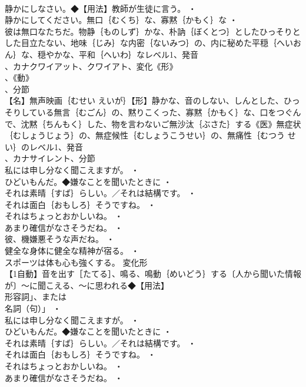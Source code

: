 \documentclass[8pt]{extreport}
\begin{document}
\begin{CJK}{UTF8}{min}
\\	静かにしなさい。◆【用法】教師が生徒に言う。 ・
\\	静かにしてください。無口｛むくち｝な、寡黙｛かもく｝な ・
\\	彼は無口なたちだ。物静｛ものしず｝かな、朴訥｛ぼくとつ｝としたひっそりとした目立たない、地味｛じみ｝な内密｛ないみつ｝の、内に秘めた平穏｛へいおん｝な、穏やかな、平和｛へいわ｝なレベル1、発音
\\	、カナクワイアット、クワイアト、変化《形》
\\	、《動》
\\	、分節
\\	【名】無声映画｛むせい えいが｝【形】静かな、音のしない、しんとした、ひっそりしている無言｛むごん｝の、黙りこくった、寡黙｛かもく｝な、口をつぐんで、沈黙｛ちんもく｝した、物を言わないご無沙汰｛ぶさた｝する《医》無症状｛むしょうじょう｝の、無症候性｛むしょうこうせい｝の、無痛性｛むつう せい｝のレベル1、発音
\\	、カナサイレント、分節
\\	私には申し分なく聞こえますが。 ・
\\	ひどいもんだ。◆嫌なことを聞いたときに ・
\\	それは素晴｛すば｝らしい。／それは結構です。 ・
\\	それは面白｛おもしろ｝そうですね。 ・
\\	それはちょっとおかしいね。 ・
\\	あまり確信がなさそうだね。 ・
\\	彼、機嫌悪そうな声だね。 ・
\\	健全な身体に健全な精神が宿る。 ・
\\	スポーツは体も心も強くする。	変化形 
\\	【1自動】音を出す［たてる］、鳴る、鳴動｛めいどう｝する〔人から聞いた情報が〕～に聞こえる、～に思われる◆【用法】
\\	形容詞」、または
\\	名詞（句）」 ・
\\	私には申し分なく聞こえますが。 ・
\\	ひどいもんだ。◆嫌なことを聞いたときに ・
\\	それは素晴｛すば｝らしい。／それは結構です。 ・
\\	それは面白｛おもしろ｝そうですね。 ・
\\	それはちょっとおかしいね。 ・
\\	あまり確信がなさそうだね。 ・

\end{CJK}
\end{document}
